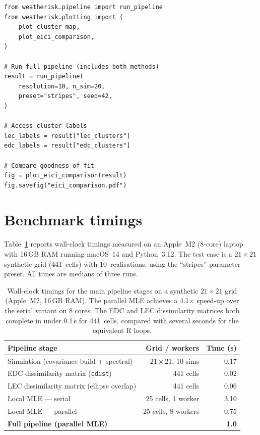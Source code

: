 \documentclass[preprint,12pt,a4paper]{elsarticle}
\begin{document}
\begin{lstlisting}[caption={Running both clustering methods
  and comparing results.}, label=lst:app-compare]
from weatherisk.pipeline import run_pipeline
from weatherisk.plotting import (
    plot_cluster_map,
    plot_eici_comparison,
)

# Run full pipeline (includes both methods)
result = run_pipeline(
    resolution=10, n_sim=20,
    preset="stripes", seed=42,
)

# Access cluster labels
lec_labels = result["lec_clusters"]
edc_labels = result["edc_clusters"]

# Compare goodness-of-fit
fig = plot_eici_comparison(result)
fig.savefig("eici_comparison.pdf")
\end{lstlisting}

\section{Benchmark timings}
\label{app:benchmark}

Table~\ref{tab:benchmark} reports wall-clock timings measured on an
Apple~M2 (8-core) laptop with 16\,GB RAM running
macOS~14 and Python~3.12.  The test case is a $21\times 21$ synthetic
grid (441~cells) with 10~realisations, using the ``stripes''
parameter preset.  All times are medians of three runs.

\begin{table}[ht]
\centering
\begin{tabular}{lrr}
\toprule
\textbf{Pipeline stage} & \textbf{Grid / workers} & \textbf{Time (s)} \\
\midrule
Simulation (covariance build + spectral) & $21\!\times\!21$, 10 sims & 0.17 \\
EDC dissimilarity matrix (\texttt{cdist}) & 441 cells & 0.02 \\
LEC dissimilarity matrix (ellipse overlap) & 441 cells & 0.06 \\
Local MLE --- serial & 25 cells, 1 worker & 3.10 \\
Local MLE --- parallel & 25 cells, 8 workers & 0.75 \\
\midrule
\textbf{Full pipeline (parallel MLE)} & & \textbf{1.0} \\
\bottomrule
\end{tabular}
\caption{Wall-clock timings for the main pipeline stages on a
  synthetic $21\times 21$ grid (Apple~M2, 16\,GB RAM).
  The parallel MLE achieves a 4.1$\times$ speed-up over the
  serial variant on 8 cores.  The EDC and LEC dissimilarity
  matrices both complete in under 0.1\,s for 441~cells,
  compared with several seconds for the equivalent
  R loops.}
\label{tab:benchmark}
\end{table}
\end{document}
